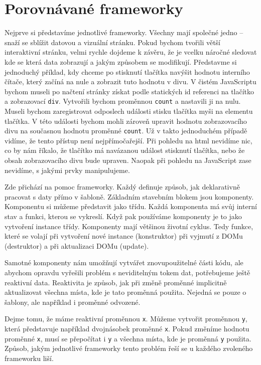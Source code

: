 \documentclass[
  master,
  program=ainf,
  tables=false,
  sourcecodes,
  glossaries,
  index
]{kidiplom}
\begin{document}
\newpage
\section{Porovnávané frameworky}
Nejprve si představíme jednotlivé frameworky. Všechny mají společné jedno --
snaží se sblížit datovou a vizuální stránku. Pokud bychom tvořili větší
interaktivní stránku, velmi rychle dojdeme k závěru, že je vcelku náročné
sledovat kde se která data zobrazují a jakým způsobem se modifikují. Představme
si jednoduchý příklad, kdy chceme po stisknutí tlačítka navýšit hodnotu
interního čítače, který začíná na nule a zobrazit tuto hodnotu v divu. V čistém
JavaScriptu \cite{js} bychom museli po načtení stránky získat podle statických id
referenci na tlačítko a zobrazovací {\tt div}. Vytvořili bychom proměnnou {\tt count} a
nastavili ji na nulu. Museli bychom zaregistrovat odposlech události stisku
tlačítka myši na elementu tlačítka. V této události bychom mohli zároveň
upravit hodnotu zobrazovacího divu na současnou hodnotu proměnné {\tt count}. Už v
takto jednoduchém případě vidíme, že tento přístup není nejpřímočařejší.
Při pohledu na html nevidíme nic, co by nám říkalo, že tlačítko má navázanou
událost stisknutí tlačítka, nebo že obsah zobrazovacího divu bude upraven.
Naopak při pohledu na JavaScript \cite{js} zase nevidíme, s jakými prvky manipulujeme.

Zde přichází na pomoc frameworky. Každý definuje způsob, jak deklarativně
pracovat s daty přímo v šabloně. Základním stavebním blokem jsou komponenty.
Komponentu si můžeme představit jako třídu. Každá komponenta má svůj interní
stav a funkci, kterou se vykreslí. Když pak používáme komponenty je to jako
vytvoření instance třídy. Komponenty mají většinou životní cyklus. Tedy funkce,
které se volají při vytvoření nové instance (konstruktor) při vyjmutí z DOMu
(destruktor) a při aktualizaci DOMu (update).

Samotné komponenty nám umožňují vytvářet znovupoužitelné části kódu, ale
abychom opravdu vyřešili problém s neviditelným tokem dat, potřebujeme ještě
reaktivní data. Reaktivita je způsob, jak při změně proměnné implicitně
aktualizovat všechna místa, kde je tato proměnná použita. Nejedná se pouze o
šablony, ale například i proměnné odvozené. 

Dejme tomu, že máme reaktivní proměnnou {\tt x}. Můžeme vytvořit proměnnou {\tt y}, která
představuje například dvojnásobek proměnné {\tt x}. Pokud změníme hodnotu proměnné {\tt x},
musí se přepočítat i {\tt y} a všechna místa, kde je proměnná {\tt y} použita. Způsob, jakým
jednotlivé frameworky tento problém řeší se u každého zvoleného frameworku liší.
\end{document}
